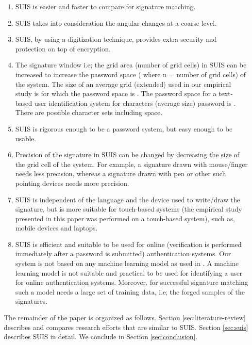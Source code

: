 \documentclass[conference]{IEEEtran}
\begin{document}
\begin{enumerate}
\item
SUIS is easier and faster to compare for signature matching.
\item
SUIS takes into consideration the angular changes at a coarse level.
\item
SUIS, by using a digitization technique, provides extra security and protection on top of encryption.
\item
The signature window i.e; the grid area (number of grid cells) in SUIS can be increased to increase the password space ( where n = number of grid cells) of the system. The size of an average grid (extended) used in our empirical study is  for which the password space is . The password space for a text-based user identification system for  characters (average size) password is . There are  possible character sets including space.
\item
SUIS is rigorous enough to be a password system, but easy enough to be usable.
\item
Precision of the signature in SUIS can be changed by decreasing the size of the grid cell of the system. For example, a signature drawn with mouse/finger needs less precision, whereas a signature drawn with pen or other such pointing devices needs more precision.
\item
SUIS is independent of the language and the device used to write/draw the signature, but is more suitable for touch-based systems (the empirical study presented in this paper was performed on a touch-based system), such as, mobile devices and laptops.
\item
SUIS is efficient and suitable to be used for online (verification is performed immediately after a password is submitted) authentication systems. Our system is not based on any machine learning model as used in \cite{java-gp}. A machine learning model is not suitable and practical to be used for identifying a user for online authentication systems. Moreover, for successful signature matching such a model needs a large set of training data, i.e; the forged samples of the signatures.
\end{enumerate}

The remainder of the paper is organized as follows. Section \ref{sec:literature-review} describes and compares research efforts that are similar to SUIS. Section \ref{sec:suis} describes SUIS in detail. We conclude in Section \ref{sec:conclusion}.
\end{document}
